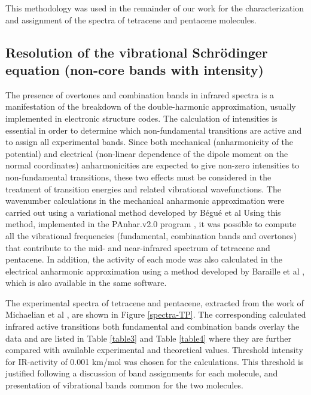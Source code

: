 This methodology was used in the remainder of our work for the characterization and assignment of the spectra of tetracene and pentacene molecules.

\subsection{Resolution of the vibrational Schrödinger equation (non-core bands with intensity)}

 The presence of overtones and combination bands in infrared spectra is a manifestation of the breakdown of the double-harmonic approximation, usually implemented in electronic structure codes. The calculation of intensities is essential in order to determine which non-fundamental transitions are active and to assign all experimental bands. Since both mechanical (anharmonicity of the potential) and electrical (non-linear dependence of the dipole moment on the normal coordinates) anharmonicities are expected to give non-zero intensities to non-fundamental transitions, these two effects must be considered in the treatment of transition energies and related vibrational wavefunctions. The wavenumber calculations in the mechanical anharmonic approximation were carried out using a variational method developed by Bégué et al \cite{begue2007comparison} Using this method, implemented in the P\textunderscore Anhar.v2.0 program \cite{gohaud2005new},  it was possible to compute all the vibrational frequencies (fundamental, combination bands and overtones) that contribute to the mid- and near-infrared spectrum of tetracene and pentacene. In addition, the activity of each mode was also calculated in the electrical anharmonic approximation using a method developed by Baraille et al \cite{begue2010calculation,baraille2001calculation} , which is also available in the same software.

The experimental spectra of tetracene and pentacene, extracted from the work of Michaelian et al \cite{michaelian2012far} , are shown in Figure \ref{spectra-TP}. The corresponding calculated infrared active transitions both fundamental and combination bands overlay the data and are listed in Table \ref{table3} and Table \ref{table4} where they are further compared with available experimental and theoretical values. Threshold intensity for IR-activity of 0.001 km/mol was chosen for the calculations. This threshold is justified following a discussion of band assignments for each molecule, and presentation of vibrational bands common for the two molecules.

